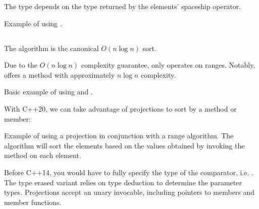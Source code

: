 The type depends on the type returned by the elements' spaceship operator.


\begin{codebox}[]{\href{https://compiler-explorer.com/z/vrEqPaEEz}{\ExternalLink}}
\footnotesize Example of using .
\tcblower
{}
\end{codebox}

\subsection{\texorpdfstring{}{\texttt{std::sort}}}

The  algorithm is the canonical $O(n\log n)$ sort.


Due to the $O(n\log n)$ complexity guarantee,  only operates on  ranges. Notably,  offers a method with approximately $n\log n$ complexity.

\begin{codebox}[]{\href{https://compiler-explorer.com/z/vef61TWj9}{\ExternalLink}}
\footnotesize Basic example of using  and .
\tcblower
{}
\end{codebox}

With C++20, we can take advantage of projections to sort by a method or member:

\begin{codebox}[breakable]{\href{https://compiler-explorer.com/z/4aGenq9b6}{\ExternalLink}}
\footnotesize Example of using a projection in conjunction with a range algorithm. The algorithm will sort the elements based on the values obtained by invoking the method  on each element.
\tcblower
{}
\end{codebox}

Before C++14, you would have to fully specify the type of the comparator, i.e. . The type erased variant  relies on type deduction to determine the parameter types. Projections accept an unary invocable, including pointers to members and member functions.

